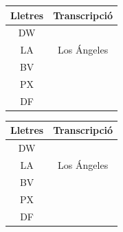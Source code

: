 \begin{table}[h]
    \begin{minipage}{.5\linewidth}
        \centering
        \begin{tabular}{|c|c|}
            \hline
            Lletres & Transcripció\\\hline
            DW &             \\\hline
            LA & Los Ángeles \\\hline
            BV &             \\\hline
            PX &             \\\hline
            DF &             \\\hline 
        \end{tabular}
    \end{minipage}
    \begin{minipage}{.5\linewidth}
        \centering
        \begin{tabular}{|c|c|}
            \hline
            Lletres & Transcripció\\\hline
            DW &             \\\hline
            LA & Los Ángeles \\\hline
            BV &             \\\hline
            PX &             \\\hline
            DF &             \\\hline 
        \end{tabular}
    \end{minipage} 
\end{table}


